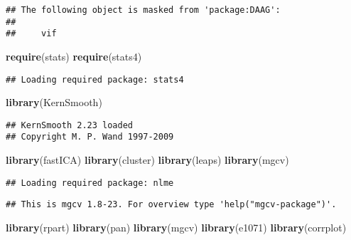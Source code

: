 \documentclass[]{article}
\newenvironment{Shaded}{\begin{snugshade}}{\end{snugshade}}
\newcommand{\KeywordTok}[1]{\textcolor[rgb]{0.13,0.29,0.53}{\textbf{#1}}}
\newcommand{\NormalTok}[1]{#1}
\begin{document}
\begin{verbatim}
## The following object is masked from 'package:DAAG':
## 
##     vif
\end{verbatim}

\begin{Shaded}
\begin{Highlighting}[]
\KeywordTok{require}\NormalTok{(stats)}
\KeywordTok{require}\NormalTok{(stats4)}
\end{Highlighting}
\end{Shaded}

\begin{verbatim}
## Loading required package: stats4
\end{verbatim}

\begin{Shaded}
\begin{Highlighting}[]
\KeywordTok{library}\NormalTok{(KernSmooth)}
\end{Highlighting}
\end{Shaded}

\begin{verbatim}
## KernSmooth 2.23 loaded
## Copyright M. P. Wand 1997-2009
\end{verbatim}

\begin{Shaded}
\begin{Highlighting}[]
\KeywordTok{library}\NormalTok{(fastICA)}
\KeywordTok{library}\NormalTok{(cluster)}
\KeywordTok{library}\NormalTok{(leaps)}
\KeywordTok{library}\NormalTok{(mgcv)}
\end{Highlighting}
\end{Shaded}

\begin{verbatim}
## Loading required package: nlme
\end{verbatim}

\begin{verbatim}
## This is mgcv 1.8-23. For overview type 'help("mgcv-package")'.
\end{verbatim}

\begin{Shaded}
\begin{Highlighting}[]
\KeywordTok{library}\NormalTok{(rpart)}
\KeywordTok{library}\NormalTok{(pan)}
\KeywordTok{library}\NormalTok{(mgcv)}
\KeywordTok{library}\NormalTok{(e1071)}
\KeywordTok{library}\NormalTok{(corrplot)}
\end{Highlighting}
\end{Shaded}
\end{document}
